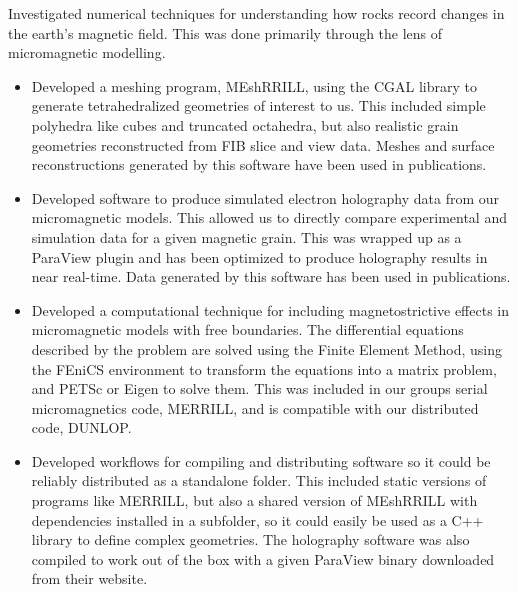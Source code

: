 \documentclass[11pt]{article}
\newenvironment{resumeSubSectionBody}{
    \par
    \vspace{-0.8\parskip}
    \begin{small}
    \par
} {
    \par
    \end{small}
    \par
}
\begin{document}
\begin{resumeSubSectionBody}

    Investigated numerical techniques for understanding how rocks record
    changes in the earth's magnetic field. This was done primarily through
    the lens of micromagnetic modelling.

    \begin{itemize}
        \item
            Developed a meshing program, MEshRRILL, using the CGAL library to
            generate tetrahedralized geometries of interest to us. This included
            simple polyhedra like cubes and truncated octahedra, but also
            realistic grain geometries reconstructed from FIB slice and view
            data. Meshes and surface reconstructions generated by this
            software have been used in publications.

        \item
            Developed software to produce simulated electron holography data
            from our micromagnetic models. This allowed us to directly compare
            experimental and simulation data for a given magnetic grain. This
            was wrapped up as a ParaView plugin and has been optimized to
            produce holography results in near real-time.
            Data generated by this software has been used in publications.

        \item
            Developed a computational technique for including magnetostrictive
            effects in micromagnetic models with free boundaries.
            The differential equations described by the problem are solved
            using the Finite Element Method, using the FEniCS environment
            to transform the equations into a matrix problem, and
            PETSc or Eigen to solve them.
            This was included in our groups serial micromagnetics code, MERRILL,
            and is compatible with our distributed code, DUNLOP.

        \item
            Developed workflows for compiling and distributing software so
            it could be reliably distributed as a standalone folder. This
            included static versions of programs like MERRILL, but also
            a shared version of MEshRRILL with dependencies installed in a
            subfolder, so it could easily be used as a C++ library to
            define complex geometries. The holography software was also compiled
            to work out of the box with a given ParaView binary downloaded
            from their website.
    \end{itemize}

\end{resumeSubSectionBody}
\end{document}
